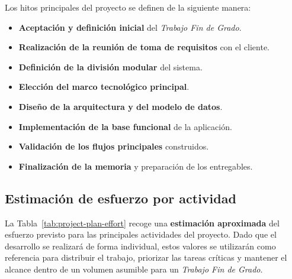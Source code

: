 Los hitos principales del proyecto se definen de la siguiente manera:

\begin{itemize}
    \item \textbf{Aceptación y definición inicial} del \textit{Trabajo Fin de Grado}.
    \item \textbf{Realización de la reunión de toma de requisitos} con el cliente.
    \item \textbf{Definición de la división modular} del sistema.
    \item \textbf{Elección del marco tecnológico principal}.
    \item \textbf{Diseño de la arquitectura y del modelo de datos}.
    \item \textbf{Implementación de la base funcional} de la aplicación.
    \item \textbf{Validación de los flujos principales} construidos.
    \item \textbf{Finalización de la memoria} y preparación de los entregables.
\end{itemize}

\subsection{Estimación de esfuerzo por actividad}

La Tabla~\ref{tab:project-plan-effort} recoge una \textbf{estimación aproximada} del esfuerzo previsto para las principales actividades del proyecto. Dado que el desarrollo se realizará de forma individual, estos valores se utilizarán como referencia para distribuir el trabajo, priorizar las tareas críticas y mantener el alcance dentro de un volumen asumible para un \textit{Trabajo Fin de Grado}.

